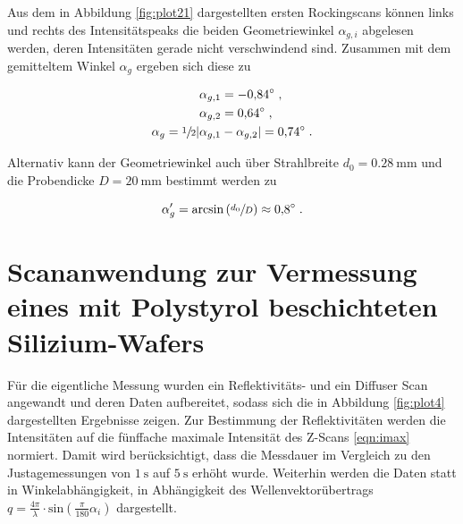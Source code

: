 Aus dem in Abbildung \ref{fig:plot21} dargestellten ersten Rockingscans
können links und rechts des Intensitätspeaks die beiden Geometriewinkel $\alpha_{g,i}$
abgelesen werden, deren Intensitäten gerade nicht verschwindend sind. 
Zusammen mit dem gemitteltem Winkel $\alpha_g$ ergeben sich diese zu

\vspace{-25pt}
\begin{align*}
    \alpha_{g,1} &= \SI{-0.84}{\degree} \; , \\
    \alpha_{g,2} &= \SI{0.64}{\degree} \; , \\
    \alpha_{g} = \sfrac{1}{2}|\alpha_{g,1} &- \alpha_{g,2}| = \SI{0.74}{\degree} \; .
\end{align*}

Alternativ kann der Geometriewinkel auch über Strahlbreite $d_0 = \SI{0.28}{\milli\meter}$ und 
die Probendicke $D = \SI{20}{\milli\meter}$ bestimmt werden zu

\begin{equation}
    \alpha'_g = \text{arcsin} \left(\sfrac{d_0}{D}\right) \approx \SI{0.8}{\degree}  \; .
\end{equation}


\section{Scananwendung zur Vermessung eines mit Polystyrol beschichteten Silizium-Wafers}

Für die eigentliche Messung wurden ein Reflektivitäts- und ein Diffuser Scan angewandt und deren Daten aufbereitet,
sodass sich die in Abbildung \ref{fig:plot4} dargestellten Ergebnisse zeigen.
Zur Bestimmung der Reflektivitäten werden die Intensitäten auf die fünffache maximale Intensität des 
Z-Scans \eqref{eqn:imax} normiert. Damit wird berücksichtigt, dass die Messdauer im Vergleich zu den Justagemessungen
von $\SI{1}{\second}$ auf $\SI{5}{\second}$ erhöht wurde.
Weiterhin werden die Daten statt in Winkelabhängigkeit, in Abhängigkeit des Wellenvektorübertrags 
$q = \frac{4\pi}{\lambda} \cdot \text{sin} \left(\frac{\pi}{180}\alpha_i\right)$ dargestellt.\\

